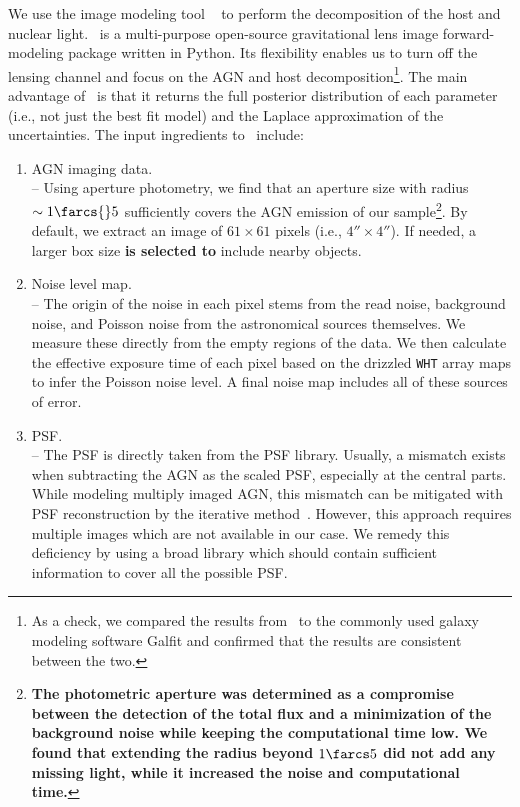 \documentclass[apj]{emulateapj}
\begin{document}
We use the image modeling tool \lenstronomy~\citep{Birrer2015, lenstronomy} to perform the decomposition of the host and nuclear light. \lenstronomy\ is a multi-purpose open-source gravitational lens image forward-modeling package written in Python. 
Its flexibility enables us to turn off the lensing channel and focus on the AGN and host decomposition\footnote{As a check, we compared the results from \lenstronomy\ to the commonly used galaxy modeling software {\sc Galfit} and confirmed that the results are consistent between the two.}. The main advantage of \lenstronomy\ is that it returns the full posterior distribution of each parameter (i.e., not just the best fit model) and the Laplace approximation of the uncertainties. The input ingredients to \lenstronomy\ include:
\begin{enumerate}
\item AGN imaging data. \\
-- Using aperture photometry, we find that an aperture size with radius $\sim1\farcs{}5$ sufficiently covers the AGN emission of our sample\footnote{\bf The photometric aperture was determined as a compromise between the detection of the total flux and a minimization of the background noise while keeping the computational time low. We found that extending the radius beyond $1\farcs5$ did not add any missing light, while it increased the noise and computational time. %
}. By default, we extract an image of $61\times61$ pixels (i.e., $4''\times 4''$). If needed, a larger box size {\bf is selected to} include nearby objects. 
\item Noise level map.\\
-- The origin of the noise in each pixel stems from the read noise, background noise, and Poisson noise from the astronomical sources themselves. We measure these directly from the empty regions of the data. We then calculate the effective exposure time of each pixel based on the drizzled \texttt{WHT} array maps to infer the Poisson noise level. A final noise map includes all of these sources of error. 
  
\item PSF. \\
-- The PSF is directly taken from the PSF library. Usually, a mismatch exists when subtracting the AGN as the scaled PSF, especially at the central parts. While modeling multiply imaged AGN, this mismatch can be mitigated with PSF reconstruction by the iterative method~\citep{Chen2016, Birrer2018}.  However, this approach requires multiple images which are not available in our case.  We remedy this deficiency by using a broad library which should contain sufficient information to cover all the possible PSF. 
\end{enumerate}
\end{document}
